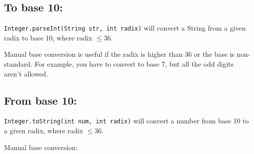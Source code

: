 
\subsection*{To base 10:}

\lstinline{Integer.parseInt(String str, int radix)} will convert a String from a given radix to base 10, where radix $\leq 36$.

Manual base conversion is useful if the radix is higher than 36 or the base is non-standard. For example, you have to convert to base 7, but all the odd digits aren't allowed.



\subsection*{From base 10:}

\lstinline{Integer.toString(int num, int radix)} will convert a number from base 10 to a given radix, where radix $\leq 36$.

Manual base conversion:


\newpage